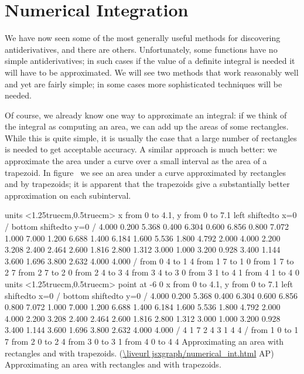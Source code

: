 \section{Numerical Integration}{}{}
\nobreak 
We have now seen some of the most generally useful methods
for discovering antiderivatives, and there are others. 
Unfortunately, some functions
have no simple antiderivatives; in such cases if the value of a
definite integral is needed it will have to be approximated. We will
see two methods that work reasonably well and yet are fairly simple;
in some cases more sophisticated techniques will be needed.

Of course, we already know one way to approximate an integral: if we
think of the integral as computing an area, we can add up the areas of
some rectangles. While this is quite simple, it is usually the case
that a large number of rectangles is needed to get acceptable
accuracy. A similar approach is much better: we approximate the area
under a curve over a small interval as the area of a trapezoid. In
figure~ we see an area under 
a curve approximated by rectangles and by trapezoids; it is apparent
that the trapezoids give a substantially better approximation on each
subinterval. 

\figure
\texonly
\vbox{\beginpicture
\normalgraphs
\ninepoint
\setcoordinatesystem units <1.25truecm,0.5truecm>
\setplotarea x from 0 to 4.1, y from 0 to 7.1
\axis left shiftedto x=0 /
\axis bottom shiftedto y=0 /
\setquadratic
{} 4.000 0.200 5.368 0.400 6.304 0.600 6.856 0.800 7.072
1.000 7.000 1.200 6.688 1.400 6.184 1.600 5.536 1.800 4.792
2.000 4.000 2.200 3.208 2.400 2.464 2.600 1.816 2.800 1.312
3.000 1.000 3.200 0.928 3.400 1.144 3.600 1.696 3.800 2.632
4.000 4.000 /
\setdashes <2pt>
\putrule from 0 4 to 1 4
\putrule from 1 7 to 1 0
\putrule from 1 7 to 2 7
\putrule from 2 7 to 2 0
\putrule from 2 4 to 3 4
\putrule from 3 4 to 3 0
\putrule from 3 1 to 4 1
\putrule from 4 1 to 4 0
\setsolid
\setcoordinatesystem units <1.25truecm,0.5truecm> point at -6 0
\setplotarea x from 0 to 4.1, y from 0 to 7.1
\axis left shiftedto x=0 /
\axis bottom shiftedto y=0 /
\setquadratic
{} 4.000 0.200 5.368 0.400 6.304 0.600 6.856 0.800 7.072
1.000 7.000 1.200 6.688 1.400 6.184 1.600 5.536 1.800 4.792
2.000 4.000 2.200 3.208 2.400 2.464 2.600 1.816 2.800 1.312
3.000 1.000 3.200 0.928 3.400 1.144 3.600 1.696 3.800 2.632
4.000 4.000 /
\setlinear
\setdashes <2pt>
 4 1 7 2 4 3 1 4 4 /
\putrule from 1 0 to 1 7
\putrule from 2 0 to 2 4
\putrule from 3 0 to 3 1
\putrule from 4 0 to 4 4
\endpicture}
\begincaption
{Approximating an area with rectangles and with trapezoids.
(\expandafter\url\expandafter{\liveurl jsxgraph/numerical_int.html}%
AP\endurl)}
\endcaption
\endtexonly
{}
\begincaption
Approximating an area with rectangles and with trapezoids.
\endcaption
\endfigure

